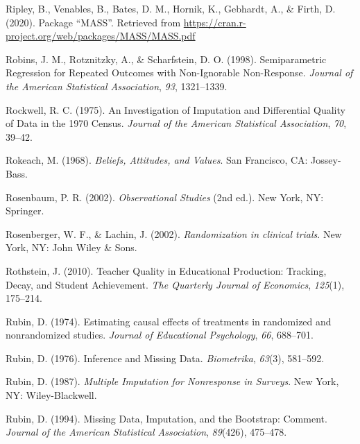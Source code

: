 \documentclass[12pt,econ]{sources/authesis}
\newenvironment{CSLReferences}%
  {}%
  {\par}
\begin{document}
\begin{CSLReferences}{1}{0}
\leavevmode{}%
Ripley, B., Venables, B., Bates, D. M., Hornik, K., Gebhardt, A., \& Firth, D. (2020). {Package {``MASS''}}. Retrieved from \url{https://cran.r-project.org/web/packages/MASS/MASS.pdf}

\leavevmode{}%
Robins, J. M., Rotznitzky, A., \& Scharfstein, D. O. (1998). {Semiparametric Regression for Repeated Outcomes with Non-Ignorable Non-Response}. \emph{Journal of the American Statistical Association}, \emph{93}, 1321--1339.

\leavevmode{}%
Rockwell, R. C. (1975). {An Investigation of Imputation and Differential Quality of Data in the 1970 Census}. \emph{Journal of the American Statistical Association}, \emph{70}, 39--42.

\leavevmode{}%
Rokeach, M. (1968). \emph{{Beliefs, Attitudes, and Values}}. San Francisco, CA: Jossey-Bass.

\leavevmode{}%
Rosenbaum, P. R. (2002). \emph{{Observational Studies}} (2nd ed.). New York, NY: Springer.

\leavevmode{}%
Rosenberger, W. F., \& Lachin, J. (2002). \emph{Randomization in clinical trials}. New York, NY: John Wiley \& Sons.

\leavevmode{}%
Rothstein, J. (2010). {Teacher Quality in Educational Production: Tracking, Decay, and Student Achievement}. \emph{The Quarterly Journal of Economics}, \emph{125}(1), 175--214.

\leavevmode{}%
Rubin, D. (1974). Estimating causal effects of treatments in randomized and nonrandomized studies. \emph{Journal of Educational Psychology}, \emph{66}, 688--701.

\leavevmode{}%
Rubin, D. (1976). {Inference and Missing Data}. \emph{Biometrika}, \emph{63}(3), 581--592.

\leavevmode{}%
Rubin, D. (1987). \emph{{Multiple Imputation for Nonresponse in Surveys}}. New York, NY: Wiley-Blackwell.

\leavevmode{}%
Rubin, D. (1994). {Missing Data, Imputation, and the Bootstrap: Comment}. \emph{Journal of the American Statistical Association}, \emph{89}(426), 475--478.


\end{CSLReferences}
\end{document}
